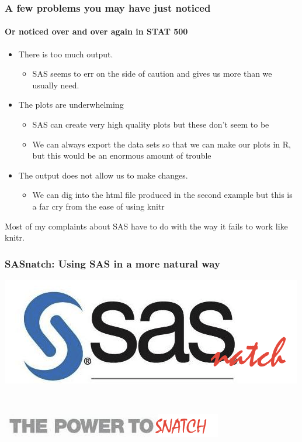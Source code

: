 \documentclass[xcolor=dvipsnames,gray,mathserif]{beamer}
\begin{document}
\begin{frame}
   \frametitle{A few problems you may have just noticed}
   \framesubtitle{Or noticed over and over again in STAT 500}
   \begin{itemize}
      \item There is too much output.
      \begin{itemize}
         \item SAS seems to err on the side of caution and gives us more than we usually need.
      \end{itemize}
      \item The plots are underwhelming
      \begin{itemize}
         \item SAS can create very high quality plots but these don't seem to be
         \item We can always export the data sets so that we can make our plots in R, but this would be an enormous amount of trouble
      \end{itemize}
      \pause
      \item The output does not allow us to make changes.
      \begin{itemize}
         \item We can dig into the html file produced in the second example
            but this is a far cry from the ease of using knitr
      \end{itemize}
   \end{itemize}
   Most of my complaints about SAS have to do with the way it fails to work like knitr.
\end{frame}

\begin{frame}[fragile]
   \frametitle{SASnatch: Using SAS in a more natural way}

   \centerline{\includegraphics[scale=.5]{sasnatchlogo1.png}} \\
   \centerline{\includegraphics[scale=.5]{sasnatchlogo2.png}}

\end{frame}
\end{document}
